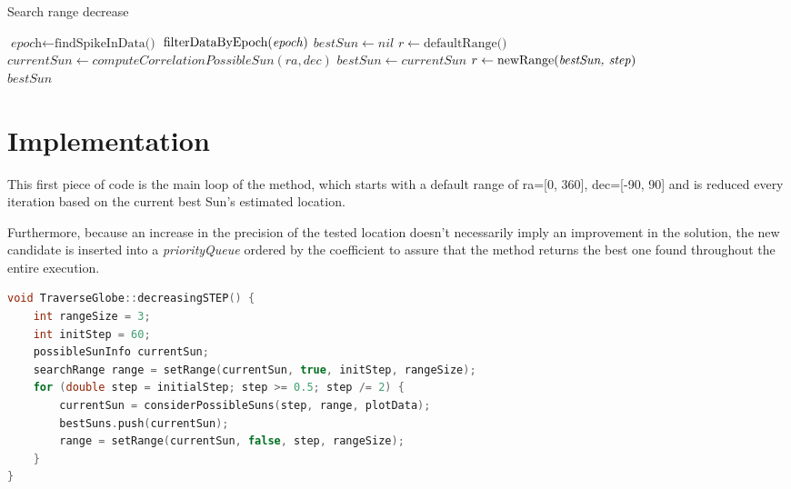 \begin{algorithm}
	\caption{Search range decrease}\label{searchRangeDecrease}
	\begin{algorithmic}[1]
		\State $\textit{epoch} \gets \text{findSpikeInData()}$
		\State $\text{filterDataByEpoch(\textit{epoch})}$
		\State $bestSun \gets nil$
		\State $r \gets \text{defaultRange()}$
		\State $currentSun \gets computeCorrelationPossibleSun(ra, dec)$
		\State $bestSun \gets currentSun$
		\State $r \gets \text{newRange(\textit{bestSun, step})}$
		\EndIf
		\EndFor
		\EndFor
		\EndFor
		\\
		\Return $bestSun$
		\EndProcedure
	\end{algorithmic}
\end{algorithm}

\section{Implementation}

This first piece of code is the main loop of the method, which starts with a default range of ra=[0, 360], dec=[-90, 90] and is reduced every iteration based on the current best Sun's estimated location.

Furthermore, because an increase in the precision of the tested location doesn't necessarily imply an improvement in the solution, the new candidate is inserted into a \textit{priorityQueue} ordered by the coefficient to assure that the method returns the best one found throughout the entire execution.

\begin{minipage}{\linewidth}
	\begin{lstlisting}[language=c, caption=Decreasing the range and increasing the precision]
void TraverseGlobe::decreasingSTEP() {
	int rangeSize = 3;
	int initStep = 60;
	possibleSunInfo currentSun;
	searchRange range = setRange(currentSun, true, initStep, rangeSize);
	for (double step = initialStep; step >= 0.5; step /= 2) {
		currentSun = considerPossibleSuns(step, range, plotData);
		bestSuns.push(currentSun);
		range = setRange(currentSun, false, step, rangeSize);
	}
}\end{lstlisting}
\end{minipage}

